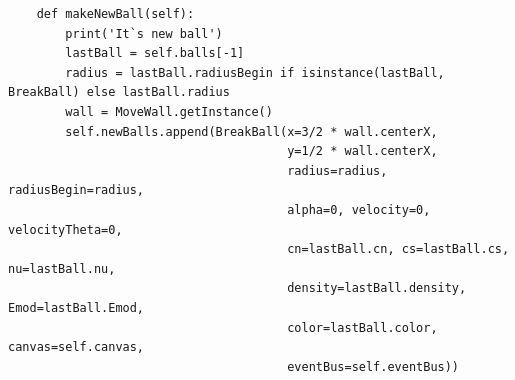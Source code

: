 \documentclass[utf8x, 14pt, oneside, a4paper]{article}
\begin{document}
\begin{lstlisting}
    def makeNewBall(self):
        print('It`s new ball')
        lastBall = self.balls[-1]
        radius = lastBall.radiusBegin if isinstance(lastBall, BreakBall) else lastBall.radius
        wall = MoveWall.getInstance()
        self.newBalls.append(BreakBall(x=3/2 * wall.centerX,
                                       y=1/2 * wall.centerX,
                                       radius=radius, radiusBegin=radius,
                                       alpha=0, velocity=0, velocityTheta=0,
                                       cn=lastBall.cn, cs=lastBall.cs, nu=lastBall.nu,
                                       density=lastBall.density, Emod=lastBall.Emod,
                                       color=lastBall.color, canvas=self.canvas,
                                       eventBus=self.eventBus))
\end{lstlisting}
\pagebreak
\end{document}
